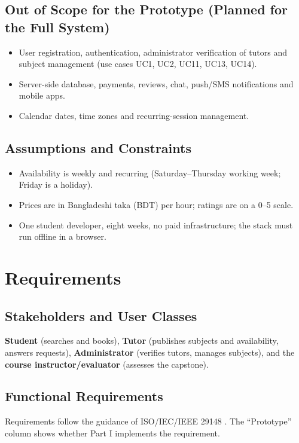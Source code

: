 \documentclass[11pt,a4paper]{article}
\begin{document}
\subsection{Out of Scope for the Prototype (Planned for the Full System)}
\begin{itemize}
  \item User registration, authentication, administrator verification of tutors and subject management (use cases UC1, UC2, UC11, UC13, UC14).
  \item Server-side database, payments, reviews, chat, push/SMS notifications and mobile apps.
  \item Calendar dates, time zones and recurring-session management.
\end{itemize}
\subsection{Assumptions and Constraints}
\begin{itemize}
  \item Availability is weekly and recurring (Saturday--Thursday working week; Friday is a holiday).
  \item Prices are in Bangladeshi taka (BDT) per hour; ratings are on a 0--5 scale.
  \item One student developer, eight weeks, no paid infrastructure; the stack must run offline in a browser.
\end{itemize}

\section{Requirements}
\subsection{Stakeholders and User Classes}
\textbf{Student} (searches and books), \textbf{Tutor} (publishes subjects and availability, answers requests), \textbf{Administrator} (verifies tutors, manages subjects), and the \textbf{course instructor/evaluator} (assesses the capstone).

\subsection{Functional Requirements}
Requirements follow the guidance of ISO/IEC/IEEE 29148 \cite{iso29148}. The ``Prototype'' column shows whether Part I implements the requirement.
\end{document}
